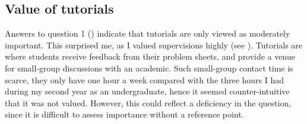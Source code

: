 \subsection{Value of tutorials}\label{sec:tutorial-value}

Answers to question 1 () indicate that tutorials are only viewed as moderately important. This surprised me, as I valued supervisions highly (see ). Tutorials are where students receive feedback from their problem sheets, and provide a venue for small-group discussions with an academic. Such small-group contact time is scarce, they only have one hour a week compared with the three hours I had during my second year as an undergraduate, hence it seemed counter-intuitive that it was not valued. However, this could reflect a deficiency in the question, since it is difficult to assess importance without a reference point.

